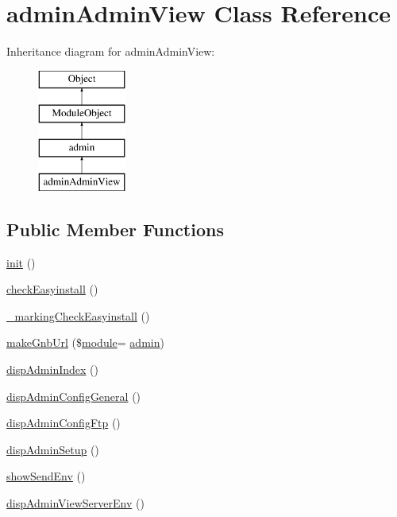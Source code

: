 \hypertarget{classadminAdminView}{}\section{admin\+Admin\+View Class Reference}
\label{classadminAdminView}
Inheritance diagram for admin\+Admin\+View\+:\begin{figure}[H]
\begin{center}
\leavevmode
\includegraphics[height=4.000000cm]{classadminAdminView}
\end{center}
\end{figure}
\subsection*{Public Member Functions}
\begin{DoxyCompactItemize}
\item 
\hyperlink{classadminAdminView_a9211d29a895ebead46f78e6fc9eab285}{init} ()
\item 
\hyperlink{classadminAdminView_ae7b11554f7c30beb8554d15b33852dd7}{check\+Easyinstall} ()
\item 
\hyperlink{classadminAdminView_ad1fe5e140900ad8f5814871ed6ae9508}{\+\_\+marking\+Check\+Easyinstall} ()
\item 
\hyperlink{classadminAdminView_ade77034df3a5bc074b5a1f1cb4c47419}{make\+Gnb\+Url} (\$\hyperlink{classmodule}{module}= \textquotesingle{}\hyperlink{classadmin}{admin}\textquotesingle{})
\item 
\hyperlink{classadminAdminView_aff78cea8f2e5632395dd4888742389b8}{disp\+Admin\+Index} ()
\item 
\hyperlink{classadminAdminView_accaee16084bc6def9e841518d227be0e}{disp\+Admin\+Config\+General} ()
\item 
\hyperlink{classadminAdminView_ac1d596c739213d4fd3f127a6ca18c155}{disp\+Admin\+Config\+Ftp} ()
\item 
\hyperlink{classadminAdminView_acfa4a5d1209080974ca5fd15d04565e9}{disp\+Admin\+Setup} ()
\item 
\hyperlink{classadminAdminView_a4c4c900f637d618a7c8fbcbf523ad801}{show\+Send\+Env} ()
\item 
\hyperlink{classadminAdminView_a6b110bb8ccba975a670fdfbe559f7118}{disp\+Admin\+View\+Server\+Env} ()
\end{DoxyCompactItemize}
